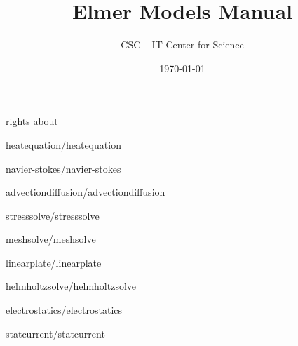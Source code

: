 \documentclass[a4paper,english,10pt]{report}    %
\title{\Huge{\bf Elmer Models Manual}}
\author{CSC -- IT Center for Science}
\date{\today}
\newcommand{\Include}{}
\begin{document}
\maketitle


\begin{versiona}
\Include{rights}
\Include{about}

\pagestyle{empty}

\setcounter{secnumdepth}{2}
\setcounter{tocdepth}{1}  

\tableofcontents
\end{versiona}



\renewcommand{\chaptername}{Model}
\newpage
\pagestyle{fancy}
\fancyhead{}
\fancyhead[LE,LO]{\bfseries \rightmark}
\fancyhead[RE,RO]{\bfseries \thepage}
\fancyfoot{}
\renewcommand{\headrulewidth}{0.4pt}
\renewcommand{\footrulewidth}{0.4pt}


\clearpage

\graphicspath{{./}{heatequation/}}
\Include{heatequation/heatequation}

\graphicspath{{./}{navier-stokes/}}
\Include{navier-stokes/navier-stokes}

\graphicspath{{./}{advectiondiffusion/}}
\Include{advectiondiffusion/advectiondiffusion}

\graphicspath{{./}{stresssolve/}}
\Include{stresssolve/stresssolve}

\graphicspath{{./}{meshsolve/}}
\Include{meshsolve/meshsolve}

\graphicspath{{./}{linearplate/}}
\Include{linearplate/linearplate}



\graphicspath{{./}{helmholtzsolve/}}
\Include{helmholtzsolve/helmholtzsolve}

\graphicspath{{./}{electrostatics/}}
\Include{electrostatics/electrostatics}

\graphicspath{{./}{statcurrent/}}
\Include{statcurrent/statcurrent}
\end{document}
